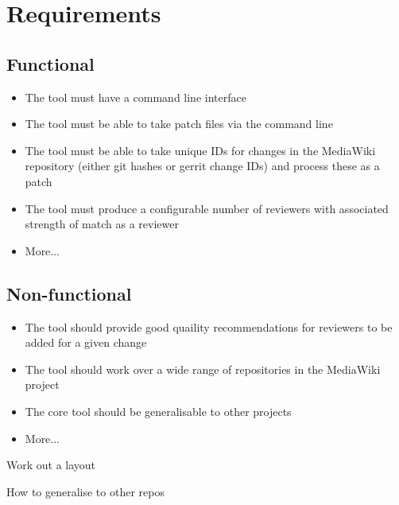 \chapter{Requirements\label{chap:requirements}}

\section{Functional}
\begin{itemize}
    \item The tool must have a command line interface
    \item The tool must be able to take patch files via the command line
    \item The tool must be able to take unique IDs for changes in the MediaWiki repository (either git hashes or gerrit change IDs) and process these as a patch
    \item The tool must produce a configurable number of reviewers with associated strength of match as a reviewer
    \item More...
\end{itemize}

\section{Non-functional}
\begin{itemize}
    \item The tool should provide good quaility recommendations for reviewers to be added for a given change
    \item The tool should work over a wide range of repositories in the MediaWiki project
    \item The core tool should be generalisable to other projects
    \item More...
\end{itemize}

Work out a layout

How to generalise to other repos